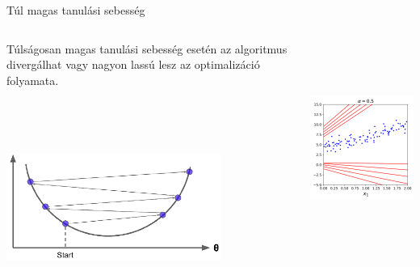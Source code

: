 \documentclass[english, aspectratio=169]{beamer}
\begin{document}
\begin{frame}{Túl magas tanulási sebesség}
\begin{columns}
\begin{column}{.5\textwidth}
Túlságosan magas tanulási sebesség esetén az algoritmus divergálhat vagy nagyon lassú lesz az optimalizáció folyamata. 
\begin{center}
\includegraphics[width=7cm, height=7cm, keepaspectratio]{images/regresszio_22.png}
\end{center}
\end{column}
\begin{column}{.5\textwidth}
\begin{center}
\includegraphics[width=7cm, height=7cm, keepaspectratio]{images/regresszio_26.png}
\end{center}
\end{column}
\end{columns}
\end{frame}
\end{document}
